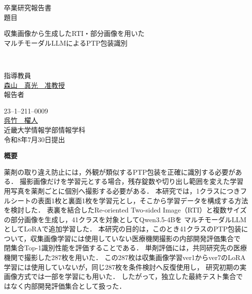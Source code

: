 \documentclass[uplatex,dvipdfmx]{jsarticle}
\begin{document}
\pagestyle{empty}

\begin{center}
\vspace*{1cm}
\large
{\LARGE 卒業研究報告書}\\
\vspace*{0.8cm}
題目\\
\vspace*{1cm}
\parbox{15.5cm}{\centering\LARGE
収集画像から生成したRTI・部分画像を用いた\\[2mm]
マルチモーダルLLMによるPTP包装識別}\\
\vspace{3mm}

\vspace*{3cm}
指導教員\\
\vspace*{0.3cm}
\underline{\LARGE 森山　真光　准教授}\\
\vspace*{3cm}
報告者\\
\vspace*{0.3cm}

{23--1--211--0009}\\
\vspace*{0.3cm}
\underline{\Huge 呉竹　櫂人}\\
\vspace*{0.5cm}
近畿大学情報学部情報学科\\
\vspace*{2cm}
令和8年7月30日提出\\
\end{center}

\newpage
\normalsize

\clearpage
\begin{center}
{\bf \Large 概要}
\end{center}

薬剤の取り違え防止には，外観が類似するPTP包装を正確に識別する必要がある．
撮影画像だけを学習元とする場合，残存錠数や切り出し範囲を変えた学習用写真を薬剤ごとに個別へ撮影する必要がある．
本研究では，1クラスにつきフルシートの表面1枚と裏面1枚を学習元とし，そこから学習データを構成する方法を検討した．
表裏を結合したRe-oriented Two-sided Image（RTI）と複数サイズの部分画像を生成し，41クラスを対象としてQwen3.5-4Bを
マルチモーダルLLMとしてLoRAで追加学習した．
本研究の目的は，このとき41クラスのPTP包装について，収集画像学習には使用していない医療機関撮影の内部開発評価集合で
閉集合Top-1識別性能を評価することである．
単剤評価には，共同研究先の医療機関で撮影した287枚を用いた．
この287枚は収集画像学習ver1からver7のLoRA学習には使用していないが，同じ287枚を条件検討へ反復使用し，
研究初期の実画像方式では一部を学習にも用いた．
したがって，独立した最終テスト集合ではなく内部開発評価集合として扱った．
\end{document}

